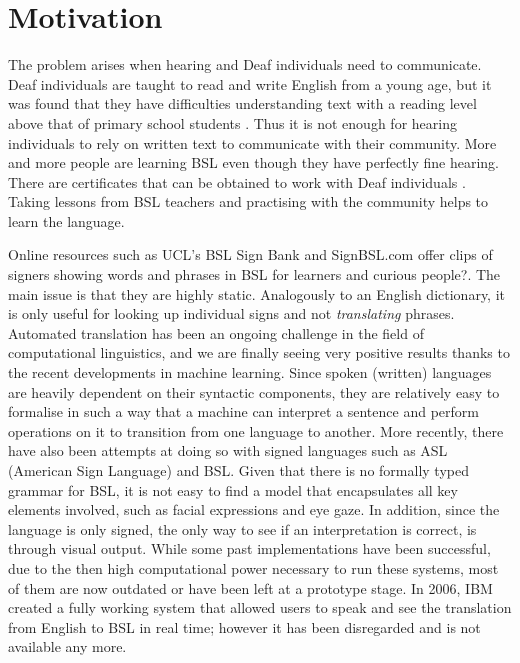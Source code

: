 \documentclass[12pt]{ociamthesis}  %
\begin{document}
\section{Motivation}
The problem arises when hearing and Deaf individuals need to communicate. Deaf individuals are taught to read and write English from a young age, but it was found that they have difficulties understanding text with a reading level above that of primary school students . Thus it is not enough for hearing individuals to rely on written text to communicate with their community. More and more people are learning BSL even though they have perfectly fine hearing. There are certificates that can be obtained to work with Deaf individuals . Taking lessons from BSL teachers and practising with the community helps to learn the language.

Online resources such as UCL's BSL Sign Bank  and SignBSL.com  offer clips of signers showing words and phrases in BSL for learners and curious people?. The main issue is that they are highly static. Analogously to an English dictionary, it is only useful for looking up individual signs and not \textit{translating} phrases. Automated translation has been an ongoing challenge in the field of
computational linguistics, and we are finally seeing very positive results thanks to the recent developments in machine learning. Since spoken (written) languages are heavily dependent on their syntactic components, they are relatively easy to formalise in such a way that a machine can interpret a sentence and perform operations on it to transition from one language to another. More recently, there have also been attempts at doing so with signed languages such as ASL (American Sign Language) and BSL. Given that there is no formally typed grammar for BSL, it is not easy to find a model that encapsulates all key elements involved, such as facial expressions and eye gaze. In addition, since the language is only signed, the only way to see if an interpretation is correct, is through visual output. While some past implementations have been successful, due to the then high computational power necessary to run these systems, most of them are now outdated or have been left at a prototype stage. In 2006, IBM created a fully working system  that allowed users to speak and see the translation from English to BSL in real time; however it has been disregarded and is not available any more. 
\end{document}
